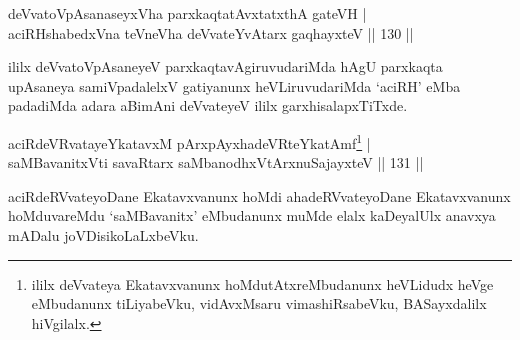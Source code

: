 
\begin{shl}
deVvatoVpAsanaseyxVha parxkaqtatAvxtatxthA gateVH | \\
aciRHshabedxVna teVneVha deVvateYvAtarx gaqhayxteV \hfill|| 130 || 
\end{shl}

\begin{artha}
ililx deVvatoVpAsaneyeV parxkaqtavAgiruvudariMda hAgU parxkaqta\break
upAsaneya samiVpadalelxV gatiyanunx heVLiruvudariMda `aciRH' eMba
padadiMda adara aBimAni deVvateyeV ililx garxhisalapxTiTxde. 
\end{artha}


\begin{shl}
aciRdeVRvatayeYkatavxM pArxpAyxhadeVRteYkatAmf\footnote{ililx deVvateya Ekatavxvanunx  hoMdutAtxreMbudanunx heVLidudx heVge eMbudanunx tiLiyabeVku,  vidAvxMsaru vimashiRsabeVku, BASayxdalilx hiVgilalx.} | \\
saMBavanitxVti savaRtarx saMbanodhxV\s tArxnuSajayxteV \hfill|| 131 || 
\end{shl}

\begin{artha}
aciRdeRVvateyoDane Ekatavxvanunx hoMdi ahadeRVvateyoDane Ekatavxvanunx
hoMduvareMdu `saMBavanitx' eMbudanunx muMde elalx kaDeyalUlx anavxya
mADalu joVDisikoLaLxbeVku.
\end{artha}


